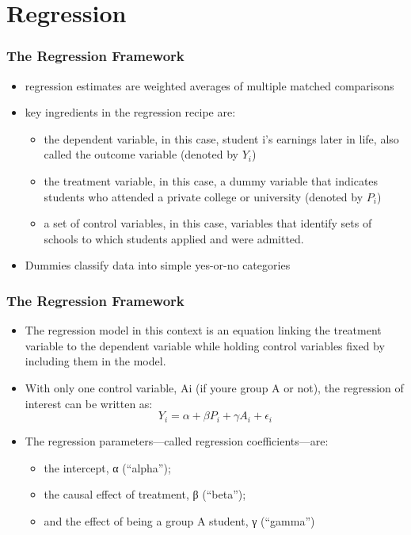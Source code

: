 \documentclass{beamer}
\begin{document}
\section{Regression} 
\begin{frame}
\frametitle{The Regression Framework}
\begin{itemize}
	\item regression estimates are weighted averages of multiple matched comparisons
	\item key ingredients in the regression recipe are:
		\begin{itemize}
			\item [\bullet] the dependent variable, in this case, student i’s earnings later in life, also called the outcome variable (denoted by $Y_i$)
			\item [\bullet] the treatment variable, in this case, a dummy variable that indicates students who attended a private college or university (denoted by $P_i$)
			\item [\bullet] a set of control variables, in this case, variables that identify sets of schools to which students applied and were admitted.
		\end{itemize}
	\item Dummies classify data into simple yes-or-no categories
\end{itemize}
	
\end{frame}
\begin{frame}
\frametitle{The Regression Framework}

\begin{itemize}
	\item The regression model in this context is an equation linking the treatment variable to the dependent variable while holding control variables fixed by including them in the model.
	\item With only one control variable, Ai (if youre group A or not), the regression of interest can be written as: 
	$$Y_i=\alpha+\beta P_i + \gamma A_i + \epsilon_i$$
	\item The regression parameters—called regression coefficients—are:
		\begin{itemize}
			\item[\bullet] the intercept, α (“alpha”);
			\item[\bullet] the causal effect of treatment, β (“beta”);
			\item[\bullet] and the effect of being a group A student, γ (“gamma”)
		\end{itemize}
\end{itemize}

\end{frame}
\end{document}
